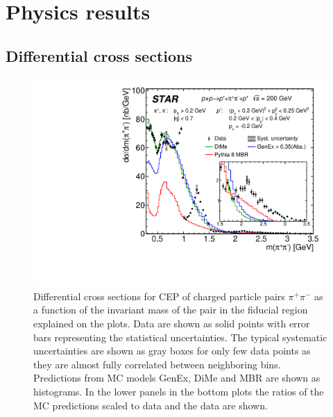 

\chapter{Physics results}\label{chap:physicsResults}

\section{Differential cross sections}

\begin{figure}[h]
\centering
\includegraphics[width=.7\textwidth,page=1]{graphics/physicsResults/FinalResult_InvMass_pion.pdf}
%
\caption{Differential cross sections for CEP of charged particle pairs $\pi^+\pi^-$ as a function of the invariant mass of the pair in the fiducial region explained on the plots. Data are shown as solid points with error bars representing the statistical uncertainties. The typical systematic uncertainties are shown as gray boxes for only few data points as they are almost fully correlated between neighboring bins. Predictions from MC models GenEx, DiMe and MBR are shown as histograms. In the lower panels in the bottom plots the ratios of the MC predictions scaled to data and the data are shown.}
\label{results_01}
\end{figure}
%
